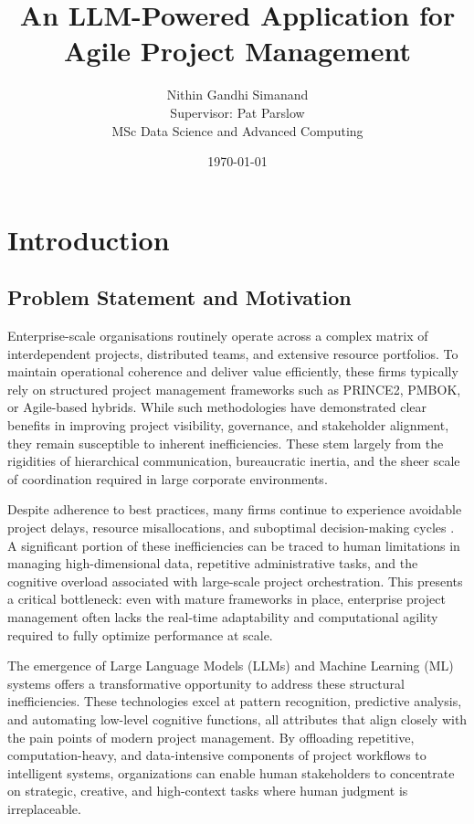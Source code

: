\documentclass{report}
\title{\textbf{An LLM-Powered Application for Agile Project Management}}
\author{Nithin Gandhi Simanand \\ Supervisor: Pat Parslow \\ MSc Data Science and Advanced Computing}
\date{\today}
\begin{document}
\maketitle

\tableofcontents
\newpage

\chapter{Introduction}  %
\section{Problem Statement and Motivation}

Enterprise-scale organisations routinely operate across a complex matrix of interdependent projects, distributed teams, and extensive resource portfolios. To maintain operational coherence and deliver value efficiently, these firms typically rely on structured project management frameworks such as PRINCE2, PMBOK, or Agile-based hybrids. While such methodologies have demonstrated clear benefits in improving project visibility, governance, and stakeholder alignment, they remain susceptible to inherent inefficiencies. These stem largely from the rigidities of hierarchical communication, bureaucratic inertia, and the sheer scale of coordination required in large corporate environments.

Despite adherence to best practices, many firms continue to experience avoidable project delays, resource misallocations, and suboptimal decision-making cycles \parencite{mankinsTurningGreatStrategy}. A significant portion of these inefficiencies can be traced to human limitations in managing high-dimensional data, repetitive administrative tasks, and the cognitive overload associated with large-scale project orchestration. This presents a critical bottleneck: even with mature frameworks in place, enterprise project management often lacks the real-time adaptability and computational agility required to fully optimize performance at scale.

The emergence of Large Language Models (LLMs) and Machine Learning (ML) systems offers a transformative opportunity to address these structural inefficiencies. These technologies excel at pattern recognition, predictive analysis, and automating low-level cognitive functions, all attributes that align closely with the pain points of modern project management. By offloading repetitive, computation-heavy, and data-intensive components of project workflows to intelligent systems, organizations can enable human stakeholders to concentrate on strategic, creative, and high-context tasks where human judgment is irreplaceable.
\end{document}
